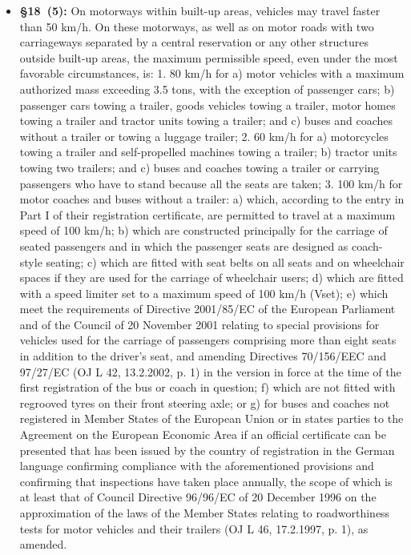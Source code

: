 \begin{itemize}
	\item \textbf{\stvo \S 18~(5):} On motorways within built-up areas, vehicles may travel faster than 50 km/h. On these motorways, as well as on motor roads with two carriageways separated by a central reservation or any other structures outside built-up areas, the maximum permissible speed, even under the most favorable circumstances, is: 1. 80 km/h for
	a) motor vehicles with a maximum authorized mass exceeding 3.5 tons, with the exception of
	passenger cars; b) passenger cars towing a trailer, goods vehicles towing a trailer, motor homes towing a trailer and tractor units towing a trailer; and c) buses and coaches without a trailer or towing a luggage trailer; 2.
	60 km/h for a) motorcycles towing a trailer and self-propelled machines towing a trailer; b) tractor units towing two trailers; and c) buses and coaches towing a trailer or carrying passengers who have to stand because all the seats are taken; 3.
	100 km/h for motor coaches and buses without a trailer:
	a) which, according to the entry in Part I of their registration certificate, are permitted to travel at
	a maximum speed of 100 km/h;
	b) which are constructed principally for the carriage of seated passengers and in which the
	passenger seats are designed as coach-style seating;
	c) which are fitted with seat belts on all seats and on wheelchair spaces if they are used for the
	carriage of wheelchair users;
	d) which are fitted with a speed limiter set to a maximum speed of 100 km/h (Vset);
	e) which meet the requirements of Directive 2001/85/EC of the European Parliament and of the
	Council of 20 November 2001 relating to special provisions for vehicles used for the carriage of
	passengers comprising more than eight seats in addition to the driver’s seat, and amending
	Directives 70/156/EEC and 97/27/EC (OJ L 42, 13.2.2002, p. 1) in the version in force at the time
	of the first registration of the bus or coach in question;
	f) which are not fitted with regrooved tyres on their front steering axle; or
	g) for buses and coaches not registered in Member States of the European Union or in states parties
	to the Agreement on the European Economic Area if an official certificate can be presented that
	has been issued by the country of registration in the German language confirming compliance
	with the aforementioned provisions and confirming that inspections have taken place annually,
	the scope of which is at least that of Council Directive 96/96/EC of 20 December 1996 on the
	approximation of the laws of the Member States relating to roadworthiness tests for motor
	vehicles and their trailers (OJ L 46, 17.2.1997, p. 1), as amended.
	

\end{itemize}
